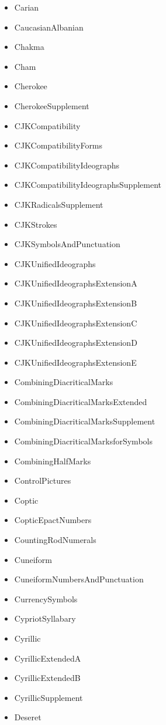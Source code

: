 ﻿\documentclass{article}
\newenvironment{itemlist}{%
  \begin{itemize}
	\setlength{\itemsep}{0pt}
	\setlength{\parsep}{0pt}
	\setlength{\topsep}{0pt}
	\setlength{\partopsep}{0pt}
	\setlength{\parskip}{0pt}
	\setlength{\labelsep}{5pt}}%
{
  \end{itemize}}
\begin{document}
\begin{multicols}{2}
\begin{itemlist}
				\item Carian
				\item CaucasianAlbanian
				\item Chakma
				\item Cham
				\item Cherokee
				\item CherokeeSupplement
				\item CJKCompatibility
				\item CJKCompatibilityForms
				\item CJKCompatibilityIdeographs
				\item CJKCompatibilityIdeographsSupplement
				\item CJKRadicalsSupplement
				\item CJKStrokes
				\item CJKSymbolsAndPunctuation
				\item CJKUnifiedIdeographs
				\item CJKUnifiedIdeographsExtensionA
				\item CJKUnifiedIdeographsExtensionB
				\item CJKUnifiedIdeographsExtensionC
				\item CJKUnifiedIdeographsExtensionD
				\item CJKUnifiedIdeographsExtensionE
				\item CombiningDiacriticalMarks
				\item CombiningDiacriticalMarksExtended
				\item CombiningDiacriticalMarksSupplement
				\item CombiningDiacriticalMarksforSymbols
				\item CombiningHalfMarks
				\item ControlPictures
				\item Coptic
				\item CopticEpactNumbers
				\item CountingRodNumerals
				\item Cuneiform
				\item CuneiformNumbersAndPunctuation
				\item CurrencySymbols
				\item CypriotSyllabary
				\item Cyrillic
				\item CyrillicExtendedA
				\item CyrillicExtendedB
				\item CyrillicSupplement
				\item Deseret

\end{itemlist}
\end{multicols}
\end{document}
